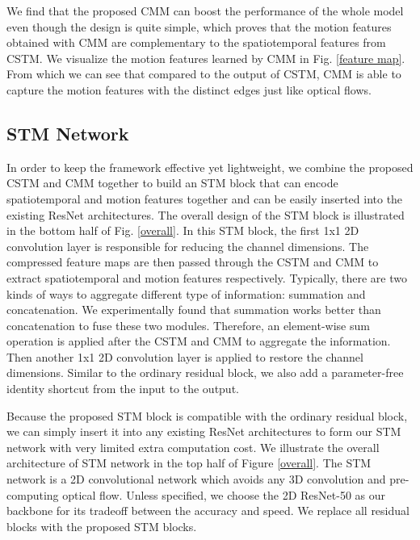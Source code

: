 \documentclass[10pt,twocolumn,letterpaper]{article}
\begin{document}
	We find that the proposed CMM can boost the performance of the whole model even though the design is quite simple, which proves that the motion features obtained with CMM are complementary to the spatiotemporal features from CSTM. We visualize the motion features learned by CMM in Fig. \ref{feature map}. From which we can see that compared to the output of CSTM, CMM  is able to capture the motion features with the distinct edges just like optical flows.
	
	\subsection{STM Network}
	In order to keep the framework effective yet lightweight, we combine the proposed CSTM and CMM together to build an STM block that can encode spatiotemporal and motion features together and can be easily inserted into the existing ResNet architectures. The overall design of the STM block is illustrated in the bottom half of Fig. \ref{overall}. In this STM block, the first 1x1 2D convolution layer is responsible for reducing the channel dimensions. The compressed feature maps are then passed through the CSTM and CMM to extract spatiotemporal and motion features respectively. Typically, there are two kinds of ways to aggregate different type of information: summation and concatenation. We experimentally found that summation works better than concatenation to fuse these two modules. Therefore, an element-wise sum operation is applied after the CSTM and CMM to aggregate the information. Then another 1x1 2D convolution layer is applied to restore the channel dimensions. Similar to the ordinary residual block, we also add a parameter-free identity shortcut from the input to the output.
	
	Because the proposed STM block is compatible with the ordinary residual block, we can simply insert it into any existing ResNet architectures to form our STM network with very limited extra computation cost. We illustrate the overall architecture of STM network in the top half of Figure \ref{overall}. The STM network is a 2D convolutional network which avoids any 3D convolution and pre-computing optical flow. Unless specified, we choose the 2D ResNet-50 \cite{he2016deep} as our backbone for its tradeoff between the accuracy and speed. We replace all residual blocks with the proposed STM blocks.
	
\end{document}
